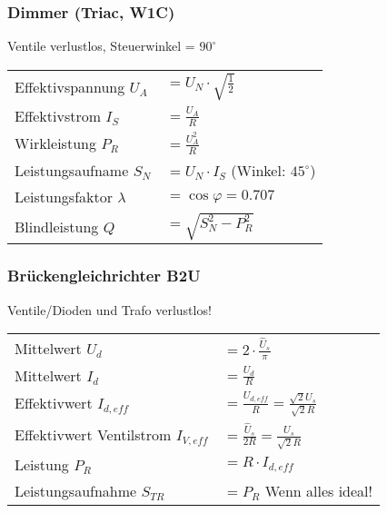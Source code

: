 \begin{multicols}{2}
\subsubsection{Dimmer (Triac, W1C)}
Ventile verlustlos, Steuerwinkel = $90^\circ$ \newline
{}

\renewcommand{\arraystretch}{1.5}
 \begin{tabular}{ll}
 	Effektivspannung $U_A$		& $ = U_N \cdot \sqrt{\frac{1}{2}}$ \\
 	Effektivstrom $I_S$			& $ = \frac{U_A}{R}$ \\
 	Wirkleistung $P_R$			& $ = \frac{U_A^2}{R} $ \\
 	Leistungsaufname $S_N$		& $ = U_N \cdot I_S $ (Winkel: $45^\circ$) \\
 	Leistungsfaktor $\lambda$	& $ = \cos \varphi = 0.707 $\\
 	Blindleistung $Q$			& $ = \sqrt{S_N^2 -P_R^2}$\\
 \end{tabular}
 \end{multicols}
 
 \begin{multicols}{2} 
 \subsubsection{Brückengleichrichter B2U}
 Ventile/Dioden und Trafo verlustlos! \newline
 
 \renewcommand{\arraystretch}{1.5}
 \begin{tabular}{ll}
 	Mittelwert $U_d$						& $ = 2 \cdot \frac{\hat{U}_s}{\pi}$ \\
 	Mittelwert $I_d$						& $ = \frac{U_d}{R}$ \\
 	Effektivwert $I_{d,eff}$				& $ = \frac{U_{d,eff}}{R} = \frac{\sqrt{2} U_s}{\sqrt{2} R}$ \\
 	Effektivwert Ventilstrom $I_{V,eff}$	& $ = \frac{\hat{U}_s}{2 R} = \frac{U_s}{\sqrt{2} R}$ \\
 	Leistung $P_R$							& $ = R \cdot I_{d,eff}$ \\
 	Leistungsaufnahme $S_{TR}$				& $ = P_R $ Wenn alles ideal!
 \end{tabular} 
 \end{multicols}
